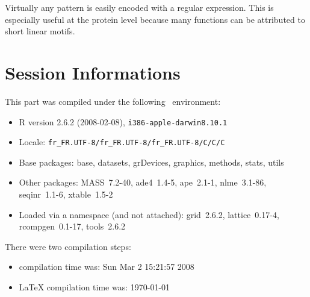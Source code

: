 \documentclass{article}
\begin{document}
Virtually any pattern is easily encoded with a regular expression. This is
especially useful at the protein level because many functions can be attributed 
to short linear motifs.


\section*{Session Informations}

This part was compiled under the following \Rlogo{}~environment:

\begin{itemize}
  \item R version 2.6.2 (2008-02-08), \verb|i386-apple-darwin8.10.1|
  \item Locale: \verb|fr_FR.UTF-8/fr_FR.UTF-8/fr_FR.UTF-8/C/C/C|
  \item Base packages: base, datasets, grDevices, graphics, methods,
    stats, utils
  \item Other packages: MASS~7.2-40, ade4~1.4-5, ape~2.1-1,
    nlme~3.1-86, seqinr~1.1-6, xtable~1.5-2
  \item Loaded via a namespace (and not attached): grid~2.6.2,
    lattice~0.17-4, rcompgen~0.1-17, tools~2.6.2
\end{itemize}
There were two compilation steps:

\begin{itemize}
  \item \Rlogo{} compilation time was: Sun Mar  2 15:21:57 2008
  \item \LaTeX{} compilation time was: \today
\end{itemize}


\clearpage
{}


\end{document}
